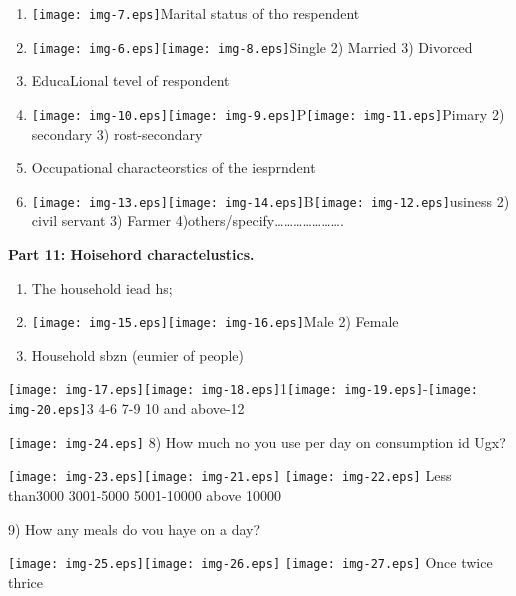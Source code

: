 \documentclass[12pt]{article}
\begin{document}
\begin{enumerate}
	\item \texttt{[image: img-7.eps]}Marital status of tho respendent
	\item \texttt{[image: img-6.eps]}\texttt{[image: img-8.eps]}Single
         2) Married              3) Divorced
	\item EducaLional tevel of respondent
	\item \texttt{[image: img-10.eps]}\texttt{[image: img-9.eps]}P\texttt{[image: img-11.eps]}Pimary
           2) secondary           3) rost-secondary
	\item Occupational characteorstics of the iesprndent
	\item \texttt{[image: img-13.eps]}\texttt{[image: img-14.eps]}B\texttt{[image: img-12.eps]}usiness
          2) civil servant          3) Farmer       
4)others/specify\ldots{}\ldots{}\ldots{}\ldots{}\ldots{}\ldots{}\ldots{}.
\end{enumerate}

\textbf{Part 11: Hoisehord charactelustics.}

\begin{enumerate}
	\item The household iead hs;
	\item \texttt{[image: img-15.eps]}\texttt{[image: img-16.eps]}Male
              2) Female
	\item Household sbzn (eumier of people)
\end{enumerate}

\texttt{[image: img-17.eps]}\texttt{[image: img-18.eps]}1\texttt{[image: img-19.eps]}-\texttt{[image: img-20.eps]}3
         4-6         7-9          10 and above-12

\texttt{[image: img-24.eps]}       8) How much no you use per day on
consumption id Ugx?

\texttt{[image: img-23.eps]}\texttt{[image: img-21.eps]}
\texttt{[image: img-22.eps]}          Less than3000            
3001-5000           5001-10000                 above 10000

{\raggedright
9) How any meals do vou haye on a day?
}

\texttt{[image: img-25.eps]}\texttt{[image: img-26.eps]}
\texttt{[image: img-27.eps]}         Once             twice         
thrice
\end{document}
